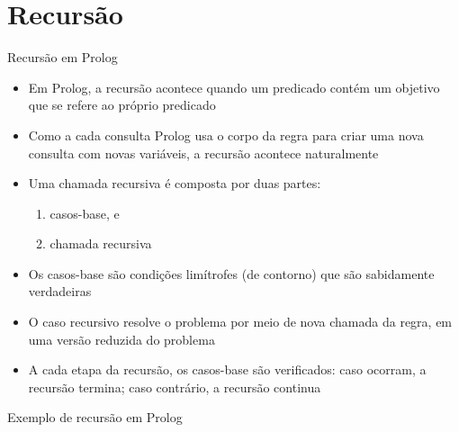 \section{Recursão}

\begin{frame}[fragile]{Recursão em Prolog}

    \begin{itemize}
        \item Em Prolog, a recursão acontece quando um predicado contém um objetivo que se 
            refere ao próprio predicado

        \item Como a cada consulta Prolog usa o corpo da regra para criar uma nova consulta 
            com novas variáveis, a recursão acontece naturalmente

        \item Uma chamada recursiva é composta por duas partes:

        \begin{enumerate}
            \item casos-base, e
            \item chamada recursiva
        \end{enumerate}

        \item Os casos-base são condições limítrofes (de contorno) que são sabidamente 
            verdadeiras

        \item O caso recursivo resolve o problema por meio de nova chamada da regra, em uma
            versão reduzida do problema

        \item A cada etapa da recursão, os casos-base são verificados: caso ocorram, a recursão 
            termina; caso contrário, a recursão continua

    \end{itemize}

\end{frame}

\begin{frame}[fragile]{Exemplo de recursão em Prolog}


\end{frame}

